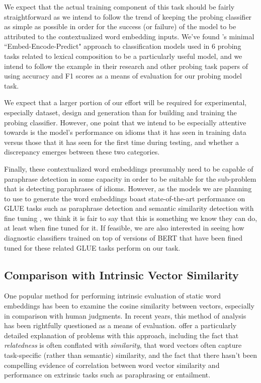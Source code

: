 \documentclass[11pt,a4paper]{article}
\begin{document}
We expect that the actual training component of this task should be fairly straightforward as we intend to follow the trend of keeping the probing classifier as simple as possible in order for the success (or failure) of the model to be attributed to the contextualized word embedding inputs. We've found \citet{shwartz2019pain}'s minimal ``Embed-Encode-Predict" approach to classification models used in 6 probing tasks related to lexical composition to be a particularly useful model, and we intend to follow the example in their research and other probing task papers of using accuracy and F1 scores as a means of evaluation for our probing model task.

We expect that a larger portion of our effort will be required for experimental, especially dataset, design and generation than for building and training the probing classifier. However, one point that we intend to be especially attentive towards is the model's performance on idioms that it has seen in training data versus those that it has seen for the first time during testing, and whether a discrepancy emerges between these two categories.

Finally, these contextualized word embeddings presumably need to be capable of paraphrase detection in some capacity in order to be suitable for the sub-problem that is detecting paraphrases of idioms. However, as the models we are planning to use to generate the word embeddings boast state-of-the-art performance on GLUE tasks such as paraphrase detection and semantic similarity detection with fine tuning \citep{devlin2018bert}, we think it is fair to say that this is something we know they can do, at least when fine tuned for it. If feasible, we are also interested in seeing how diagnostic classifiers trained on top of versions of BERT that have been fined tuned for these related GLUE tasks perform on our task. 

\subsection{Comparison with Intrinsic Vector Similarity}
One popular method for performing intrinsic evaluation of static word embeddings has been to examine the cosine similarity between vectors, especially in comparison with human judgments. In recent years, this method of analysis has been rightfully questioned as a means of evaluation. \citet{faruqui-etal-2016-problems} offer a particularly detailed explanation of problems with this approach, including the fact that \textit{relatedness} is often conflated with \textit{similarity}, that word vectors often capture task-specific (rather than semantic) similarity, and the fact that there hasn't been compelling evidence of correlation between word vector similarity and performance on extrinsic tasks such as paraphrasing or entailment.
\end{document}
